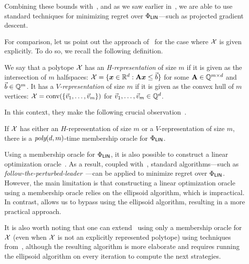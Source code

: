 Combining these bounds with~, and as we saw earlier in~, we are able to use standard techniques for minimizing regret over $\Phi_\mathsf{LIN}$---such as projected gradient descent.

For comparison, let us point out the approach of~\citet{Daskalakis24:Efficient} for the case where ${\mathcal{X}}$ is given explicitly. To do so, we recall the following definition.

\begin{definition}
    \label{def:repr}
We say that a polytope ${\mathcal{X}}$ has an \emph{H-representation} of size $m$ if it is given as the intersection of $m$ halfspaces: ${\mathcal{X}} = \{  {\bm{x}} \in \mathbb R^d : 
\mathbf{A} {\bm{x}} \leq \vec{b} \}$ for some $\mathbf{A} \in \mathbb Q^{m \times d}$ and $\vec{b} \in \mathbb Q^m$. It has a \emph{$V$-representation} of size $m$ if it is given as the convex hull of $m$ vertices: ${\mathcal{X}} = \text{conv}( \{ \vec{v}_1, \dots, \vec{v}_m \} )$ for $\vec{v}_1, \dots, \vec{v}_m \in \mathbb Q^d$.    
\end{definition}

In this context, they make the following crucial observation~\citep[Lemmas 3.1 and 3.2]{Daskalakis24:Efficient}.

\begin{lemma}
    \label{lemma:H-V}
    If ${\mathcal{X}}$ has either an $H$-representation of size $m$ or a $V$-representation of size $m$, there is a $\textit{poly}(d, m)$-time membership oracle for $\Phi_\mathsf{LIN}$.
\end{lemma}

Using a membership oracle for $\Phi_\mathsf{LIN}$, it is also possible to construct a linear optimization oracle~\citep{Grotschel12:Geometric}. As a result, coupled with~, standard algorithms---such as \emph{follow-the-perturbed-leader}~\citep{Hazan16:Introduction}---can be applied to minimize regret over $\Phi_\mathsf{LIN}$. However, the main limitation is that constructing a linear optimization oracle using a membership oracle relies on the ellipsoid algorithm, which is impractical. In contrast,  allows us to bypass using the ellipsoid algorithm, resulting in a more practical approach.

It is also worth noting that one can extend~ using only a membership oracle for ${\mathcal{X}}$ (even when ${\mathcal{X}}$ is not an explicitly represented polytope) using techniques from~\citet{Daskalakis24:Efficient}, although the resulting algorithm is more elaborate and requires running the ellipsoid algorithm on every iteration to compute the next strategies.


